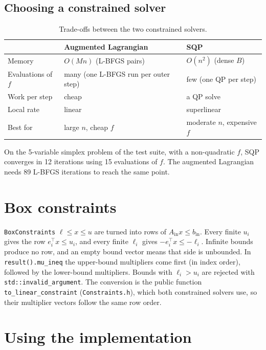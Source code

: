 \documentclass[11pt,a4paper]{article}
\newcommand{\Ain}{A_{\mathrm{in}}}
\newcommand{\bin}{b_{\mathrm{in}}}
\begin{document}
\subsection{Choosing a constrained solver}
\begin{table}[ht]
\centering
\begin{tabular}{@{}l>{\raggedright\arraybackslash}p{5.2cm}>{\raggedright\arraybackslash}p{5.2cm}@{}}
\toprule
 & Augmented Lagrangian & SQP \\
\midrule
Memory & $O(Mn)$ (L-BFGS pairs) & $O(n^2)$ (dense $B$) \\
Evaluations of $f$ & many (one L-BFGS run per outer step) & few (one QP per step) \\
Work per step & cheap & a QP solve \\
Local rate & linear & superlinear \\
Best for & large $n$, cheap $f$ & moderate $n$, expensive $f$ \\
\bottomrule
\end{tabular}
\caption{Trade-offs between the two constrained solvers.}
\end{table}
On the 5-variable simplex problem of the test suite, with a non-quadratic $f$, SQP converges in 12
iterations using 15 evaluations of $f$. The augmented Lagrangian
needs 89 L-BFGS iterations to reach the same point.

\section{Box constraints}\label{sec:box}

\texttt{BoxConstraints} $\ell\le x\le u$ are turned into rows of $\Ain x\le\bin$.
Every finite $u_i$ gives the row $e_i^\top x\le u_i$, and every finite $\ell_i$ gives
$-e_i^\top x\le-\ell_i$. Infinite bounds produce no row, and an empty bound
vector means that side is unbounded. In \texttt{result().mu\_ineq} the upper-bound
multipliers come first (in index order), followed by the lower-bound
multipliers.
Bounds with $\ell_i>u_i$ are rejected with \texttt{std::invalid\_argument}.
The conversion is the public function \texttt{to\_linear\_constraint}
(\texttt{Constraints.h}), which both constrained solvers use, so their
multiplier vectors follow the same row order.

\section{Using the implementation}
\end{document}
